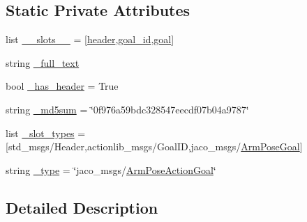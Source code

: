 \subsection*{Static Private Attributes}
\begin{DoxyCompactItemize}
\item 
list \hyperlink{classjaco__msgs_1_1msg_1_1__ArmPoseActionGoal_1_1ArmPoseActionGoal_a466f5740ee029c6eca033fa698bc9b68}{\+\_\+\+\_\+slots\+\_\+\+\_\+} = \mbox{[}\textquotesingle{}\hyperlink{classjaco__msgs_1_1msg_1_1__ArmPoseActionGoal_1_1ArmPoseActionGoal_a5306d39d1f1d9fac907a1be35d8f3a61}{header}\textquotesingle{},\textquotesingle{}\hyperlink{classjaco__msgs_1_1msg_1_1__ArmPoseActionGoal_1_1ArmPoseActionGoal_ae3ea72079050262cb7aa3631b06a3d90}{goal\+\_\+id}\textquotesingle{},\textquotesingle{}\hyperlink{classjaco__msgs_1_1msg_1_1__ArmPoseActionGoal_1_1ArmPoseActionGoal_aa44704a711912d8f0b1abb1352d1b71d}{goal}\textquotesingle{}\mbox{]}
\item 
string \hyperlink{classjaco__msgs_1_1msg_1_1__ArmPoseActionGoal_1_1ArmPoseActionGoal_afa2de1728135999a9729cffafa8ce67d}{\+\_\+full\+\_\+text}
\item 
bool \hyperlink{classjaco__msgs_1_1msg_1_1__ArmPoseActionGoal_1_1ArmPoseActionGoal_aa1acdab352d943375c07d0d5d530e340}{\+\_\+has\+\_\+header} = True
\item 
string \hyperlink{classjaco__msgs_1_1msg_1_1__ArmPoseActionGoal_1_1ArmPoseActionGoal_a46f459deb9954e12c33c89e71346cb27}{\+\_\+md5sum} = \char`\"{}0f976a59bdc328547eecdf07b04a9787\char`\"{}
\item 
list \hyperlink{classjaco__msgs_1_1msg_1_1__ArmPoseActionGoal_1_1ArmPoseActionGoal_aedf3895dc18914923f879e854518efb0}{\+\_\+slot\+\_\+types} = \mbox{[}\textquotesingle{}std\+\_\+msgs/Header\textquotesingle{},\textquotesingle{}actionlib\+\_\+msgs/Goal\+ID\textquotesingle{},\textquotesingle{}jaco\+\_\+msgs/\hyperlink{classjaco__msgs_1_1msg_1_1__ArmPoseGoal_1_1ArmPoseGoal}{Arm\+Pose\+Goal}\textquotesingle{}\mbox{]}
\item 
string \hyperlink{classjaco__msgs_1_1msg_1_1__ArmPoseActionGoal_1_1ArmPoseActionGoal_a1b5369758b619adec96412a9998f05a7}{\+\_\+type} = \char`\"{}jaco\+\_\+msgs/\hyperlink{classjaco__msgs_1_1msg_1_1__ArmPoseActionGoal_1_1ArmPoseActionGoal}{Arm\+Pose\+Action\+Goal}\char`\"{}
\end{DoxyCompactItemize}


\subsection{Detailed Description}


